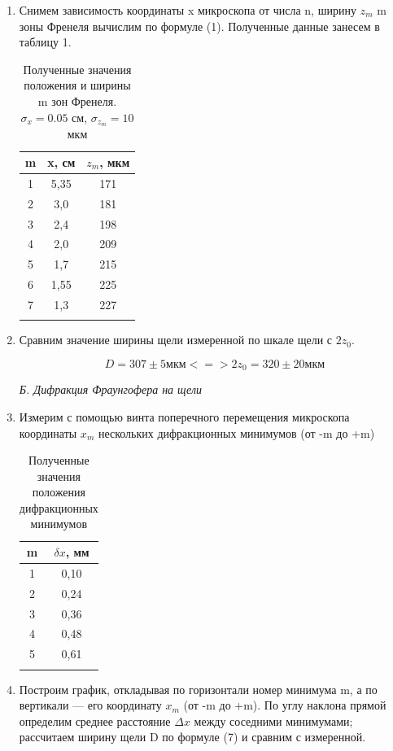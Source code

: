 \documentclass[a4paper, 12pt]{article}%
\begin{document}
\begin{enumerate}
	\item Снимем зависимость координаты x
	микроскопа от числа n, ширину $z_m$ m зоны Френеля вычислим по формуле (1). Полученные данные занесем в таблицу 1.
	
	
	\begin{longtable}{|c|c|c|}
		\hline
		m & x, см & $z_m$, мкм  \\ \hline
		1 & 5,35 & 171 \\ \hline
		2 & 3,0 & 181 \\ \hline
		3 & 2,4 & 198 \\ \hline
		4 & 2,0 & 209 \\ \hline
		5 & 1,7 & 215 \\ \hline
		6 & 1,55 & 225 \\ \hline
		7 & 1,3 & 227 \\ \hline
		\caption{Полученные значения положения и ширины m зон Френеля.
		$\sigma_x = 0.05$ см, $\sigma_{z_m} = 10$ мкм}
	\end{longtable}

\item Сравним значение ширины щели измеренной по шкале щели с $2z_0$. 

$$ D = 307 \pm 5 \text{мкм} <=> 2z_0 = 320 \pm 20 \text{мкм}$$ 

\textit{Б. Дифракция Фраунгофера на щели}\\

\item Измерим с помощью винта поперечного перемещения микроскопа координаты $x_m$ нескольких дифракционных минимумов (от -m до +m)

\begin{longtable}{|c|c|}
 	\hline
 	m & $\delta x$, мм\\ \hline
 	1 & 0,10 \\ \hline
 	2 & 0,24 \\ \hline
 	3 & 0,36 \\ \hline
 	4 & 0,48 \\ \hline
 	5 & 0,61 \\ \hline
 	\caption{Полученные значения положения дифракционных минимумов}
\end{longtable}

\item Построим график, откладывая по горизонтали номер минимума m, а по вертикали — его координату $x_m$ (от -m до +m). По углу наклона прямой определим среднее расстояние $\Delta x$ между соседними минимумами; рассчитаем ширину щели D по формуле (7) и сравним с измеренной.


\end{enumerate}
\end{document}
